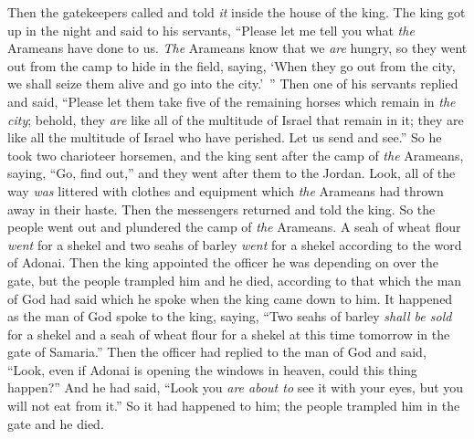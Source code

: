 \begin{biblechapter}
\verse Then the gatekeepers called and told \textit{it} inside the house of the king.
\verse The king got up in the night and said to his servants, “Please let me tell you what \textit{the} Arameans have done to us. \textit{The} Arameans know that we \textit{are} hungry, so they went out from the camp to hide in the field, saying, ‘When they go out from the city, we shall seize them alive and go into the city.’ ”
\verse Then one of his servants replied and said, “Please let them take five of the remaining horses which remain in \textit{the city}; behold, they \textit{are} like all of the multitude of Israel that remain in it; they are like all the multitude of Israel who have perished. Let us send and see.”
\verse So he took two charioteer horsemen, and the king sent after the camp of \textit{the} Arameans, saying, “Go, find out,”
\verse and they went after them to the Jordan. Look, all of the way \textit{was} littered with clothes and equipment which \textit{the} Arameans had thrown away in their haste. Then the messengers returned and told the king.
 So the people went out and plundered the camp of \textit{the} Arameans. A seah of wheat flour \textit{went} for a shekel and two seahs of barley \textit{went} for a shekel according to the word of Adonai.
\verse Then the king appointed the officer he was depending on over the gate, but the people trampled him and he died, according to that which the man of God had said which he spoke when the king came down to him.
\verse It happened as the man of God spoke to the king, saying, “Two seahs of barley \textit{shall be sold} for a shekel and a seah of wheat flour for a shekel at this time tomorrow in the gate of Samaria.”
\verse Then the officer had replied to the man of God and said, “Look, even if Adonai is opening the windows in heaven, could this thing happen?” And he had said, “Look you \textit{are about to} see it with your eyes, but you will not eat from it.”
\verse So it had happened to him; the people trampled him in the gate and he died.
\end{biblechapter}


